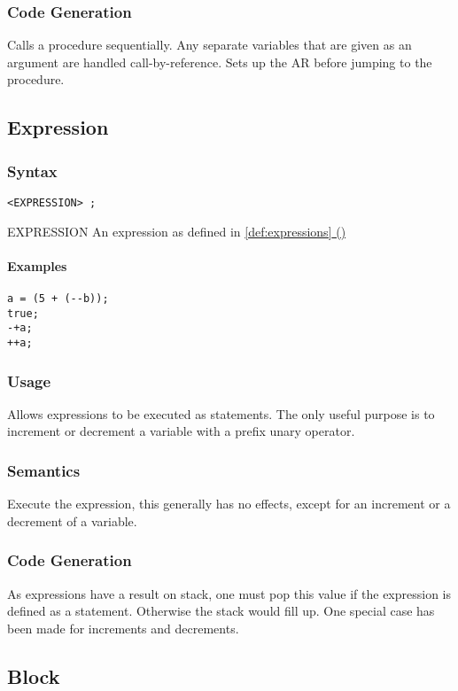 \documentclass[twoside]{report}
\newcommand*{\fullref}[1]{\hyperref[{#1}]{\ref*{#1} (\nameref*{#1})}}
\newenvironment{mycompactdesc}{\begin{adjustwidth}{0.53cm}{}\begin{compactdesc}}{\end{compactdesc}\end{adjustwidth}}
\begin{document}
\subsubsection*{Code Generation}
Calls a procedure sequentially. Any separate variables that are given as an argument are handled call-by-reference. Sets up the AR before jumping to the procedure. 


\subsection{Expression}
\label{def:expression_statement}
\subsubsection*{Syntax}
\texttt{<EXPRESSION> ;}
\begin{mycompactdesc}
	\item[EXPRESSION] An expression as defined in \fullref{def:expressions}
\end{mycompactdesc}
\paragraph{Examples}
\begin{verbatim}
a = (5 + (--b));
true;
-+a;
++a;
\end{verbatim}
\subsubsection*{Usage}
Allows expressions to be executed as statements. The only useful purpose is to increment or decrement a variable with a prefix unary operator.
\subsubsection*{Semantics}
Execute the expression, this generally has no effects, except for an increment or a decrement of a variable.
\subsubsection*{Code Generation}
As expressions have a result on stack, one must pop this value if the expression is defined as a statement. Otherwise the stack would fill up. One special case has been made for increments and decrements.


\subsection{Block}
\label{def:block}
\end{document}
